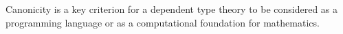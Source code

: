 \noindent
Canonicity is a key criterion for a dependent type theory to be considered as
a programming language or as a computational foundation for mathematics.

